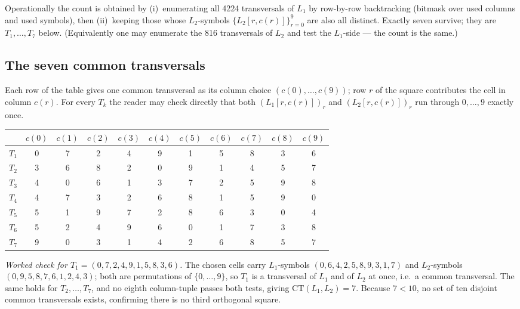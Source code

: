 \documentclass[11pt,a4paper]{article}
\theoremstyle{remark}
\newcommand{\CT}{\mathrm{CT}}
\begin{document}
Operationally the count is obtained by (i)~enumerating all 4224 transversals
of $L_1$ by row-by-row backtracking (bitmask over used columns and used
symbols), then (ii)~keeping those whose $L_2$-symbols
$\{L_2[r,c(r)]\}_{r=0}^{9}$ are also all distinct. Exactly seven survive; they
are $T_1,\dots,T_7$ below. (Equivalently one may enumerate the 816
transversals of $L_2$ and test the $L_1$-side --- the count is the same.)

\subsection*{The seven common transversals}

Each row of the table gives one common transversal as its column choice
$(c(0),\dots,c(9))$; row $r$ of the square contributes the cell in column
$c(r)$. For every $T_k$ the reader may check directly that both
$(L_1[r,c(r)])_{r}$ and $(L_2[r,c(r)])_{r}$ run through $0,\dots,9$ exactly
once.

\begin{center}
\begin{tabular}{c|cccccccccc}
\toprule
 & $c(0)$ & $c(1)$ & $c(2)$ & $c(3)$ & $c(4)$ & $c(5)$ & $c(6)$ & $c(7)$ & $c(8)$ & $c(9)$\\
\midrule
$T_{1}$ & 0 & 7 & 2 & 4 & 9 & 1 & 5 & 8 & 3 & 6 \\
$T_{2}$ & 3 & 6 & 8 & 2 & 0 & 9 & 1 & 4 & 5 & 7 \\
$T_{3}$ & 4 & 0 & 6 & 1 & 3 & 7 & 2 & 5 & 9 & 8 \\
$T_{4}$ & 4 & 7 & 3 & 2 & 6 & 8 & 1 & 5 & 9 & 0 \\
$T_{5}$ & 5 & 1 & 9 & 7 & 2 & 8 & 6 & 3 & 0 & 4 \\
$T_{6}$ & 5 & 2 & 4 & 9 & 6 & 0 & 1 & 7 & 3 & 8 \\
$T_{7}$ & 9 & 0 & 3 & 1 & 4 & 2 & 6 & 8 & 5 & 7 \\
\bottomrule
\end{tabular}
\end{center}

\noindent\emph{Worked check for $T_1=(0,7,2,4,9,1,5,8,3,6)$.} The chosen
cells carry $L_1$-symbols
$(0,6,4,2,5,8,9,3,1,7)$ and $L_2$-symbols $(0,9,5,8,7,6,1,2,4,3)$; both are
permutations of $\{0,\dots,9\}$, so $T_1$ is a transversal of $L_1$ and of
$L_2$ at once, i.e.\ a common transversal. The same holds for
$T_2,\dots,T_7$, and no eighth column-tuple passes both tests, giving
$\CT(L_1,L_2)=7$. Because $7<10$, no set of ten disjoint common transversals
exists, confirming there is no third orthogonal square.
\end{document}
